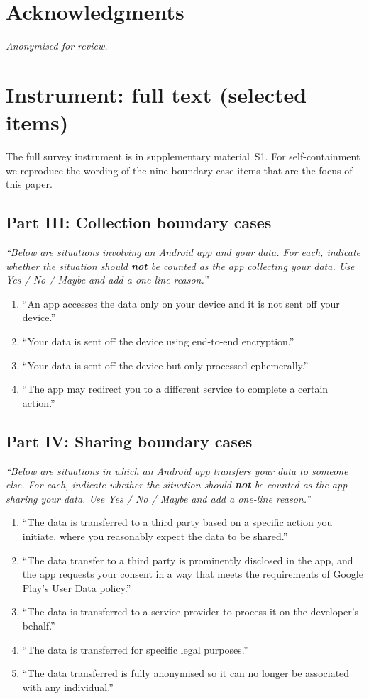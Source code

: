 \documentclass[11pt,a4paper]{article}
\makeatletter
\let\@oldsection\section
\renewcommand{\section}{\FloatBarrier\@oldsection}
\makeatother
\begin{document}
\section*{Acknowledgments}
\emph{Anonymised for review.}



\appendix

\section{Instrument: full text (selected items)}\label{app:instrument}
The full survey instrument is in supplementary material~S1. For
self-containment we reproduce the wording of the nine boundary-case
items that are the focus of this paper.

\subsection*{Part III: Collection boundary cases}
\textit{``Below are situations involving an Android app and your
data. For each, indicate whether the situation should \textbf{not}
be counted as the app collecting your data. Use Yes / No / Maybe and
add a one-line reason.''}
\begin{enumerate}
\item[$b_1$.] ``An app accesses the data only on your device and it
is not sent off your device.''
\item[$b_2$.] ``Your data is sent off the device using end-to-end
encryption.''
\item[$b_3$.] ``Your data is sent off the device but only processed
ephemerally.''
\item[$b_4$.] ``The app may redirect you to a different service to
complete a certain action.''
\end{enumerate}

\subsection*{Part IV: Sharing boundary cases}
\textit{``Below are situations in which an Android app transfers
your data to someone else. For each, indicate whether the situation
should \textbf{not} be counted as the app sharing your data. Use
Yes / No / Maybe and add a one-line reason.''}
\begin{enumerate}
\item[$b_5$.] ``The data is transferred to a third party based on a
specific action you initiate, where you reasonably expect the data
to be shared.''
\item[$b_6$.] ``The data transfer to a third party is prominently
disclosed in the app, and the app requests your consent in a way
that meets the requirements of Google Play's User Data policy.''
\item[$b_7$.] ``The data is transferred to a service provider to
process it on the developer's behalf.''
\item[$b_8$.] ``The data is transferred for specific legal
purposes.''
\item[$b_9$.] ``The data transferred is fully anonymised so it can
no longer be associated with any individual.''
\end{enumerate}
\end{document}
